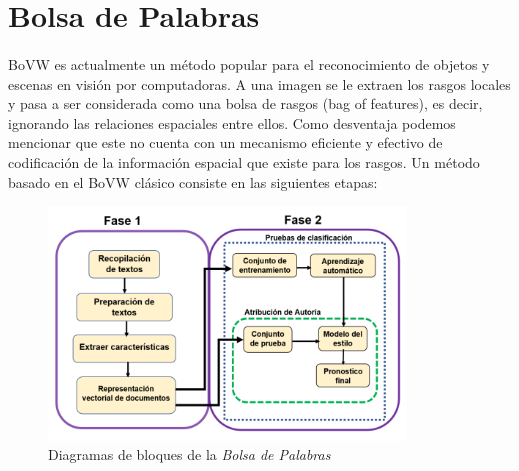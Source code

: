 \section{Bolsa de Palabras}
\paragraph{}
BoVW es actualmente un método popular para el reconocimiento de objetos y escenas en visión por computadoras. A una imagen se le extraen los rasgos locales y pasa a ser considerada como una bolsa de rasgos (bag of features), es decir, ignorando las relaciones espaciales entre ellos. Como desventaja podemos mencionar que este no cuenta con un mecanismo eficiente y efectivo de codificación de la información espacial que existe para los rasgos. Un método basado en el BoVW clásico consiste en las siguientes etapas:

\begin{figure}[h!]
	\begin{center}
	\includegraphics[angle=0,width=9.5cm]{Graficos/diagrama_bloques}
	\caption{Diagramas de bloques de la \textit{Bolsa de Palabras}}
	\label{fig:diagrama_bloques}
  \end{center}
\end{figure}

